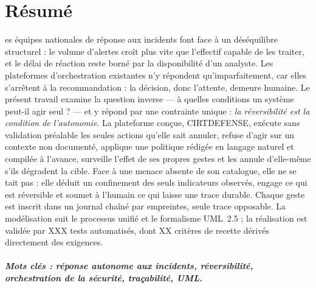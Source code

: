\chapter*{R\'esum\'e}
es \'equipes nationales de r\'eponse aux incidents font face \`a un
d\'es\'equilibre structurel : le volume d'alertes cro\^it plus vite que l'effectif
capable de les traiter, et le d\'elai de r\'eaction reste born\'e par la disponibilit\'e
d'un analyste. Les plateformes d'orchestration existantes n'y r\'epondent
qu'imparfaitement, car elles s'arr\^etent \`a la recommandation : la d\'ecision, donc
l'attente, demeure humaine. Le pr\'esent travail examine la question inverse
--- \`a quelles conditions un syst\`eme peut-il agir seul ? --- et y r\'epond par une
contrainte unique : \emph{la r\'eversibilit\'e est la condition de l'autonomie}. La
plateforme con\c cue, CIRTDEFENSE, ex\'ecute sans validation pr\'ealable les seules
actions qu'elle sait annuler, refuse d'agir sur un contexte non document\'e,
applique une politique r\'edig\'ee en langage naturel et compil\'ee \`a l'avance,
surveille l'effet de ses propres gestes et les annule d'elle-m\^eme s'ils d\'egradent
la cible. Face \`a une menace absente de son catalogue, elle ne se tait pas : elle
d\'eduit un confinement des seuls indicateurs observ\'es, engage ce qui est
r\'eversible et soumet \`a l'humain ce qui laisse une trace durable. Chaque geste est
inscrit dans un journal cha\^in\'e par empreintes, seule trace opposable. La
mod\'elisation suit le processus unifi\'e et le formalisme UML~2.5 ; la r\'ealisation
est valid\'ee par XXX tests automatis\'es, dont XX crit\`eres de recette d\'eriv\'es
directement des exigences.

\paragraph{Mots cl\'es : r\'eponse autonome aux incidents, r\'eversibilit\'e, orchestration
de la s\'ecurit\'e, tra\c cabilit\'e, UML.}

\clearpage
